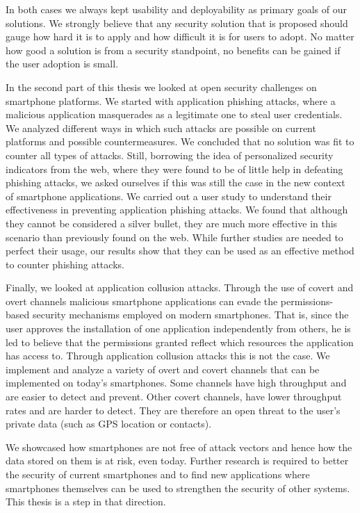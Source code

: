 In both cases we always kept usability and deployability as primary goals of our solutions. We strongly believe that any security solution that is proposed should gauge how hard it is to apply and how difficult it is for users to adopt. No matter how good a solution is from a security standpoint, no benefits can be gained if the user adoption is small.

In the second part of this thesis we looked at open security challenges on smartphone platforms. We started with application phishing attacks, where a malicious application masquerades as a legitimate one to steal user credentials. We analyzed different ways in which such attacks are possible on current platforms and possible countermeasures. We concluded that no solution was fit to counter all types of attacks. Still, borrowing the idea of personalized security indicators from the web, where they were found to be of little help in defeating phishing attacks, we asked ourselves if this was still the case in the new context of smartphone applications. We carried out a user study to understand their effectiveness in preventing application phishing attacks. We found that although they cannot be considered a silver bullet, they are much more effective in this scenario than previously found on the web. While further studies are needed to perfect their usage, our results show that they can be used as an effective method to counter phishing attacks.

Finally, we looked at application collusion attacks. Through the use of covert and overt channels malicious smartphone applications can evade the permissions-based security mechanisms employed on modern smartphones. That is, since the user approves the installation of one application independently from others, he is led to believe that the permissions granted reflect which resources the application has access to. Through application collusion attacks this is not the case. We implement and analyze a variety of overt and covert channels that can be implemented on today's smartphones. Some channels have high throughput and are easier to detect and prevent. Other covert channels, have lower throughput rates and are harder to detect. They are therefore an open threat to the user's private data (such as GPS location or contacts).

We showcased how smartphones are not free of attack vectors and hence how the data stored on them is at risk, even today. Further research is required to better the security of current smartphones and to find new applications where smartphones themselves can be used to strengthen the security of other systems. This thesis is a step in that direction.